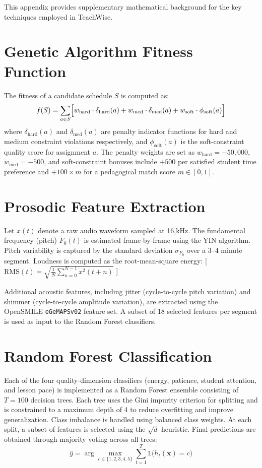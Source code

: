 This appendix provides supplementary mathematical background for the key techniques employed in TeachWise.

\section*{Genetic Algorithm Fitness Function}

The fitness of a candidate schedule $S$ is computed as:
\[
f(S) = \sum_{a \in S} \Bigl[ w_{\text{hard}} \cdot \delta_{\text{hard}}(a) + w_{\text{med}} \cdot \delta_{\text{med}}(a) + w_{\text{soft}} \cdot \phi_{\text{soft}}(a) \Bigr]
\]
where $\delta_{\text{hard}}(a)$ and $\delta_{\text{med}}(a)$ are penalty indicator functions for hard and medium constraint violations respectively, and $\phi_{\text{soft}}(a)$ is the soft-constraint quality score for assignment $a$. The penalty weights are set as $w_{\text{hard}} = -50{,}000$, $w_{\text{med}} = -500$, and soft-constraint bonuses include $+500$ per satisfied student time preference and $+100 \times m$ for a pedagogical match score $m \in [0,1]$.

\section*{Prosodic Feature Extraction}

Let $x(t)$ denote a raw audio waveform sampled at 16,kHz. The fundamental frequency (pitch) $F_0(t)$ is estimated frame-by-frame using the YIN algorithm. Pitch variability is captured by the standard deviation $\sigma_{F_0}$ over a 3--4 minute segment. Loudness is computed as the root-mean-square energy:
[
$\text{RMS}(t) = \sqrt{\frac{1}{N}\sum_{n=0}^{N-1} x^2(t+n)}$
]

Additional acoustic features, including jitter (cycle-to-cycle pitch variation) and shimmer (cycle-to-cycle amplitude variation), are extracted using the OpenSMILE \texttt{eGeMAPSv02} feature set. A subset of 18 selected features per segment is used as input to the Random Forest classifiers.

\section*{Random Forest Classification}

Each of the four quality-dimension classifiers (energy, patience, student attention, and lesson pace) is implemented as a Random Forest ensemble consisting of $T = 100$ decision trees. Each tree uses the Gini impurity criterion for splitting and is constrained to a maximum depth of 4 to reduce overfitting and improve generalization. Class imbalance is handled using balanced class weights. At each split, a subset of features is selected using the $\sqrt{d}$ heuristic. Final predictions are obtained through majority voting across all trees:
\[
\hat{y} = \arg\max_{c \in \{1,2,3,4,5\}}
\sum_{t=1}^{T} \mathbb{1}\big(h_t(\mathbf{x}) = c\big)
\]

